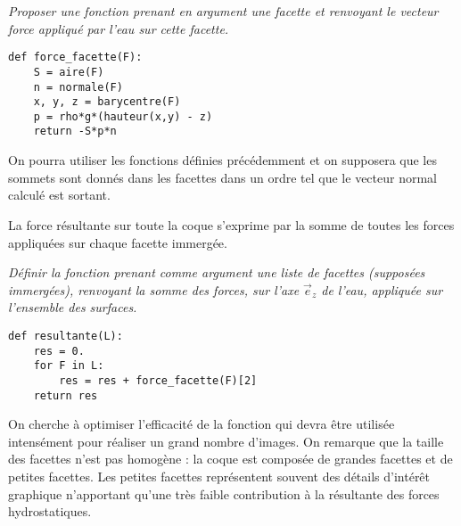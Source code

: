 \begin{Exercise}\it 
Proposer une fonction  prenant en argument une facette et renvoyant le vecteur force appliqué par l’eau sur cette facette. 
\end{Exercise}
\begin{Answer}
\begin{lstlisting}
def force_facette(F):
    S = aire(F)
    n = normale(F)
    x, y, z = barycentre(F)
    p = rho*g*(hauteur(x,y) - z)
    return -S*p*n
\end{lstlisting}
\end{Answer}
On pourra utiliser les fonctions définies précédemment et on supposera que les sommets sont donnés dans les facettes dans un ordre tel que le vecteur normal calculé est sortant.


\medskip
La force résultante sur toute la coque s’exprime par la somme de toutes les forces appliquées sur chaque facette immergée.
\begin{Exercise}\it 
Définir la fonction  prenant comme argument une liste  de facettes (supposées immergées), renvoyant la somme des forces, sur l’axe $\vec e_z$ de l’eau, appliquée sur l’ensemble des surfaces.
\end{Exercise}
\begin{Answer}
\begin{lstlisting}
def resultante(L):
    res = 0.
    for F in L:
        res = res + force_facette(F)[2]
    return res
\end{lstlisting}
\end{Answer}
\medskip

 On cherche à optimiser l’efficacité de la fonction  qui devra être utilisée intensément pour réaliser un grand nombre d’images. On remarque que la taille des facettes n’est pas homogène : la coque est composée de grandes facettes et de petites facettes. Les petites facettes représentent souvent des détails d’intérêt graphique n’apportant qu’une très faible contribution à la résultante  des forces hydrostatiques.
 

